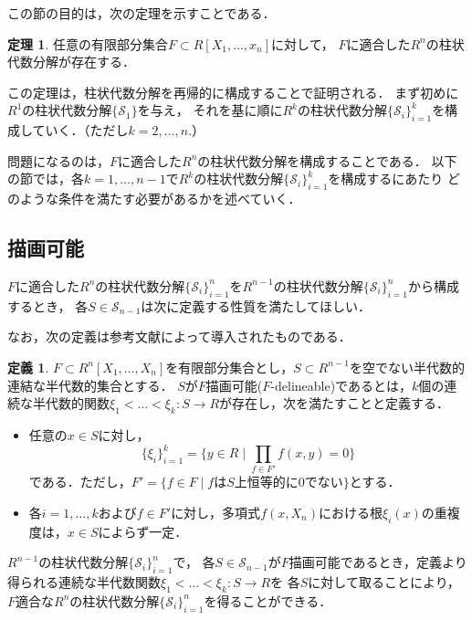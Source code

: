 \documentclass[uplatex, dvipdfmx]{jsarticle}
\newcommand{\calS}{\mathcal{S}}
\newcommand{\map}[3]{{#1}:{#2}\rightarrow{#3}}
\theoremstyle{definition}
\newtheorem{definition}{定義}[section]
\newtheorem{theorem}{定理}[section]
\begin{document}
この節の目的は，次の定理を示すことである．

\begin{theorem} \label{theorem:cad}
     任意の有限部分集合$F \subset R[X_1, \dots, x_n]$に対して，
     $F$に適合した$R^n$の柱状代数分解が存在する．
\end{theorem}

この定理は，柱状代数分解を再帰的に構成することで証明される．
まず初めに$R^1$の柱状代数分解$\{\calS_1\}$を与え，
それを基に順に$R^k$の柱状代数分解$\{\calS_i\}_{i=1}^k$を構成していく．（ただし$k=2, \dots, n$.）

問題になるのは，$F$に適合した$R^n$の柱状代数分解を構成することである．
以下の節では，各$k=1, \dots, n-1$で$R^k$の柱状代数分解$\{\calS_i\}_{i=1}^k$を構成するにあたり
どのような条件を満たす必要があるかを述べていく．

\subsection{描画可能}
$F$に適合した$R^n$の柱状代数分解$\{\calS_i\}_{i=1}^n$を$R^{n-1}$の柱状代数分解$\{\calS_i\}_{i=1}^n$から構成するとき，
各$S \in \calS_{n-1}$は次に定義する性質を満たしてほしい．

なお，次の定義は参考文献\cite{Collins}によって導入されたものである．

\begin{definition} 
     $F \subset R^n[X_1, \dots, X_n]$を有限部分集合とし，$S \subset R^{n-1}$を空でない半代数的連結な半代数的集合とする．
     $S$が$F$描画可能($F$-delineable)であるとは，$k$個の連続な半代数的関数$\map{\xi_1<\dots<\xi_k}{S}{R}$が存在し，次を満たすことと定義する．
     \begin{itemize}
          \item 任意の$ x \in S $に対し，
          \[
               \{\xi_i\}_{i=1}^k = \{y \in R \mid \prod_{f \in F'}f(x,y)=0\}
          \]
          である．ただし，$F' = \{f \in F \mid \text{$f$は$S$上恒等的に0でない}\}$とする．
          \item 各$i=1, \dots, k$および$f \in F'$に対し，多項式$f(x,X_n)$における根$\xi_i(x)$の重複度は，$x\in S$によらず一定．
     \end{itemize}
\end{definition}

$R^{n-1}$の柱状代数分解$\{\calS_i\}_{i=1}^n$で，
各$S \in \calS_{n-1}$が$F$描画可能であるとき，定義より得られる連続な半代数関数$\map{\xi_1<\dots<\xi_k}{S}{R}$を
各$S$に対して取ることにより，$F$適合な$R^n$の柱状代数分解$\{\calS_i\}_{i=1}^n$を得ることができる．
\end{document}
